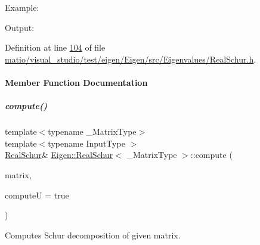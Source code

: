 Example\+: 
\begin{DoxyCodeInclude}
\end{DoxyCodeInclude}
 Output\+: 
\begin{DoxyVerbInclude}
\end{DoxyVerbInclude}
 

Definition at line \hyperlink{matio_2visual__studio_2test_2eigen_2_eigen_2src_2_eigenvalues_2_real_schur_8h_source_l00104}{104} of file \hyperlink{matio_2visual__studio_2test_2eigen_2_eigen_2src_2_eigenvalues_2_real_schur_8h_source}{matio/visual\+\_\+studio/test/eigen/\+Eigen/src/\+Eigenvalues/\+Real\+Schur.\+h}.



\paragraph{Member Function Documentation}
\mbox{\label{group___eigenvalues___module_a60caf9ffad11d728ea458c4dd36d0a98}} 
\subparagraph{\texorpdfstring{compute()}{compute()}\hspace{0.1cm}{\footnotesize\ttfamily [1/2]}}
{\footnotesize\ttfamily template$<$typename \+\_\+\+Matrix\+Type$>$ \\
template$<$typename Input\+Type $>$ \\
\hyperlink{group___eigenvalues___module_class_eigen_1_1_real_schur}{Real\+Schur}\& \hyperlink{group___eigenvalues___module_class_eigen_1_1_real_schur}{Eigen\+::\+Real\+Schur}$<$ \+\_\+\+Matrix\+Type $>$\+::compute (\begin{DoxyParamCaption}\item[{const \hyperlink{group___core___module_struct_eigen_1_1_eigen_base}{Eigen\+Base}$<$ Input\+Type $>$ \&}]{matrix,  }\item[{bool}]{computeU = {\ttfamily true} }\end{DoxyParamCaption})}



Computes Schur decomposition of given matrix. 


